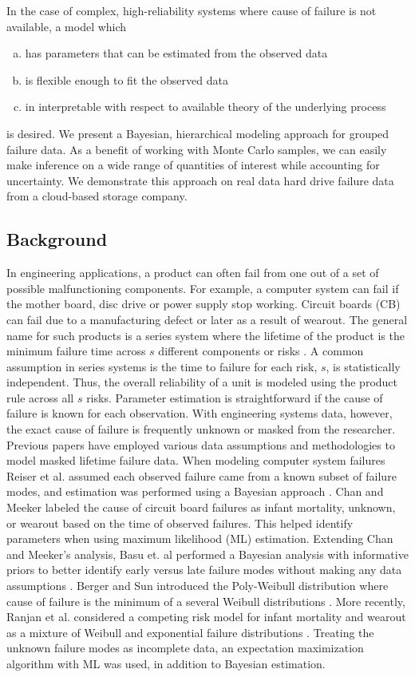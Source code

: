 \documentclass[12pt]{article}
\begin{document}
In the case of complex, high-reliability systems where cause of failure is
not available, a model which
\begin{enumerate}[a.]
\item has parameters that can be estimated from the observed data
\item is flexible enough to fit the observed data
\item in interpretable with respect to available theory of the underlying process
\end{enumerate}
is desired. We present a Bayesian, hierarchical modeling approach for
grouped failure data. As a benefit of working with Monte Carlo
samples, we can easily make inference on a wide range of quantities of
interest while accounting for uncertainty. We demonstrate this approach on real data hard
drive failure data from a
cloud-based storage company.

\subsection{Background}
In engineering applications, a product can often fail from one out of a set of possible malfunctioning components.  For example, a computer system can fail if the mother board, disc drive or power supply stop working.  Circuit boards (CB) can fail due to a manufacturing defect or later as a result of wearout.  The general name for such products is a series system where the lifetime of the product is the minimum failure time across $s$ different components or risks \citet{nelson}.  A common assumption in series systems is the time to failure for each risk, $s$, is statistically independent.  Thus, the overall reliability of a unit is modeled using the product rule across all $s$ risks.  Parameter estimation is straightforward if the cause of failure is known for each observation.  With engineering systems data, however, the exact cause of failure is frequently unknown or masked from the researcher.  \\

Previous papers have employed various data assumptions and methodologies to model masked lifetime failure data.  When modeling computer system failures Reiser et al. assumed each observed failure came from a known subset of failure modes, and estimation was performed using a Bayesian approach \cite{reiser}.  Chan and Meeker labeled the cause of circuit board failures as infant mortality, unknown, or wearout based on the time of observed failures.  This helped identify parameters when using maximum likelihood (ML) estimation.  Extending Chan and Meeker's analysis, Basu et. al performed a Bayesian analysis with informative priors to better identify early versus late failure modes without making any data assumptions \cite{basu}.  Berger and Sun introduced the Poly-Weibull distribution where cause of failure is the minimum of a several Weibull distributions \cite{berger}.  More recently, Ranjan et al. considered a competing risk model for infant mortality and wearout as a mixture of Weibull and exponential failure distributions \cite{ranjan}.  Treating the unknown failure modes as incomplete data, an expectation maximization algorithm with ML was used, in addition to Bayesian estimation.
\end{document}
